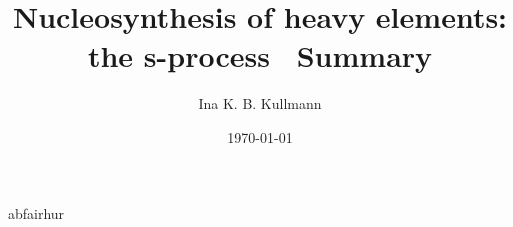 \documentclass[a4paper,12pt]{article}
\title{Nucleosynthesis of heavy elements: the s-process \
Summary}
\author{Ina K. B. Kullmann}
\date{\today}
\begin{document}
\maketitle

\section{ }
\subsection{ }




abfairhur


\end{document}
